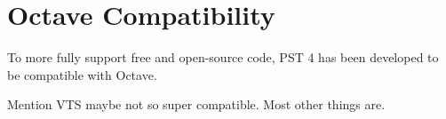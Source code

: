 \section{Octave Compatibility}
To more fully support free and open-source code, PST 4 has been developed to be compatible with Octave.

Mention VTS maybe not so super compatible.
Most other things are.